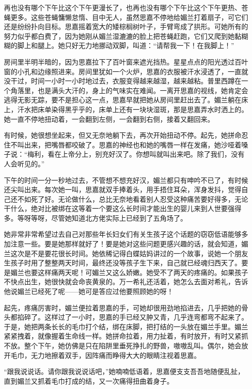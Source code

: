 \par 再也没有哪个下午比这个下午更漫长了，也再也没有哪个下午比这个下午更热、苍蝇更多。这些苍蝇慵懒怠惰、目中无人，虽然思嘉不停地给媚兰打着扇子，可它们还是纷纷扑向目标。思嘉摇着宽大的矮棕榈树叶子，手臂弯成了拱形。可她所有的努力似乎都白费了，因为她刚从媚兰湿漉漉的脸上把苍蝇赶跑，它们又爬到她黏糊糊的脚上和腿上。她只好无力地挪动双脚，叫道：“请帮我一下！在我脚上！”
\par 房间里半明半暗的，因为思嘉拉下了百叶窗来遮光挡热。星星点点的阳光透过百叶窗的小孔和边缘照进来。房间里犹如一个火炉，思嘉的衣服被汗水浸透了，一直就没干过，时间一小时一小时地过去，衣服变得越来越湿，越来越粘。普里西蹲在一个角落里，也是满头大汗的，身上的气味实在难闻。一离开思嘉的视线，她肯定会逃得无影无踪，要不是担心这一点，思嘉早就把她从房间里赶出去了。媚兰躺在床上，汗水把床单染得黑乎乎的，床单上还有一块块湿斑，那是思嘉弄水时洒上的。她一直不停地扭动着，一会翻到左侧，一会翻到右侧，接着又翻回来。
\par 有时候，她很想坐起来，但又无奈地躺下去，再次开始扭动不停。起先，她拼命忍住不叫出来，把嘴唇都咬破了。思嘉的神经也和她的嘴唇一样在发痛，她沙哑着嗓子说：“梅利，看在上帝分上，别充好汉了。你想叫就叫出来吧。除了我们，没有人会听见的。”
\par 下午的时间一分一秒地过去，不管想不想充好汉，媚兰都只有呻吟不已了，有时候还尖叫出来。每次她一叫，思嘉就双手捧着头，用手捂住耳朵，浑身发抖，觉得自己还不如死了好。无论做什么，总比无奈地看着别人忍受这种痛苦要好得多，无论干什么，绝对比被绑在这等着一个要这么长时间才能出生的婴儿来到人世要强得多。等呀等呀，尽管她知道北方佬实际上已经到了五角场了。
\par 她非常非常希望过去自己对那些年长妇女们有关生孩子这个话题的窃窃低语能够多加注意一些。要是她那样就好了！要是她对这些问题更感兴趣的话，就会知道，媚兰这次是不是要花很长时间。她依稀记得白蝶姑妈讲过的一个故事，说她一个朋友生孩子时用了整整两天时间，最终还没等孩子生下来，自己就已经魂归西天了。要是媚兰也要这样痛两天呢！可媚兰又这么娇嫩。她受不了两天的疼痛的。如果孩子不快点出生，她很快就会命丧黄泉的。万一希礼还活着，她怎么去面对希礼，告诉他说媚兰已经死了呢——她可是答应过他要照顾她的呀！
\par 起先，疼痛厉害时，媚兰便拉着思嘉的手，可她却很用劲地掐进去，几乎把她的骨头都掐碎了。这样过了一小时，思嘉的手已经又肿又青，几乎连弯都弯不起来了。于是，她把两条长长的毛巾打个结，绑在床脚，把打结的一头放在媚兰手里。媚兰紧紧拽着，就像握着生命线一样。她拼命拉着，用力扯着，有时放开，有时又紧抓不放。整个下午，她仿佛是只在陷阱里垂死挣扎的野兽，嗷嗷乱叫。偶尔，她会放开毛巾，无力地擦着双手，因阵痛而睁得大大的眼睛注视着思嘉。
\par “跟我说说话。请你跟我说说话吧，”她喃喃低语着，思嘉便支支吾吾地随便乱扯，直到媚兰又抓着毛巾打成的结，又一次痛得扭曲着身子。
